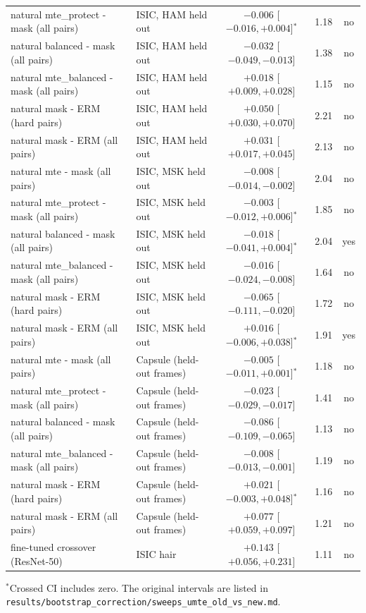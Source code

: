 \begin{center}
{\begin{tabular}{llccc}
natural mte\_protect - mask (all pairs) & ISIC, HAM held out & $-0.006$ [$-0.016, +0.004$]$^*$ & 1.18 & no \\
natural balanced - mask (all pairs) & ISIC, HAM held out & $-0.032$ [$-0.049, -0.013$] & 1.38 & no \\
natural mte\_balanced - mask (all pairs) & ISIC, HAM held out & $+0.018$ [$+0.009, +0.028$] & 1.15 & no \\
natural mask - ERM (hard pairs) & ISIC, HAM held out & $+0.050$ [$+0.030, +0.070$] & 2.21 & no \\
natural mask - ERM (all pairs) & ISIC, HAM held out & $+0.031$ [$+0.017, +0.045$] & 2.13 & no \\
natural mte - mask (all pairs) & ISIC, MSK held out & $-0.008$ [$-0.014, -0.002$] & 2.04 & no \\
natural mte\_protect - mask (all pairs) & ISIC, MSK held out & $-0.003$ [$-0.012, +0.006$]$^*$ & 1.85 & no \\
natural balanced - mask (all pairs) & ISIC, MSK held out & $-0.018$ [$-0.041, +0.004$]$^*$ & 2.04 & yes \\
natural mte\_balanced - mask (all pairs) & ISIC, MSK held out & $-0.016$ [$-0.024, -0.008$] & 1.64 & no \\
natural mask - ERM (hard pairs) & ISIC, MSK held out & $-0.065$ [$-0.111, -0.020$] & 1.72 & no \\
natural mask - ERM (all pairs) & ISIC, MSK held out & $+0.016$ [$-0.006, +0.038$]$^*$ & 1.91 & yes \\
natural mte - mask (all pairs) & Capsule (held-out frames) & $-0.005$ [$-0.011, +0.001$]$^*$ & 1.18 & no \\
natural mte\_protect - mask (all pairs) & Capsule (held-out frames) & $-0.023$ [$-0.029, -0.017$] & 1.41 & no \\
natural balanced - mask (all pairs) & Capsule (held-out frames) & $-0.086$ [$-0.109, -0.065$] & 1.13 & no \\
natural mte\_balanced - mask (all pairs) & Capsule (held-out frames) & $-0.008$ [$-0.013, -0.001$] & 1.19 & no \\
natural mask - ERM (hard pairs) & Capsule (held-out frames) & $+0.021$ [$-0.003, +0.048$]$^*$ & 1.16 & no \\
natural mask - ERM (all pairs) & Capsule (held-out frames) & $+0.077$ [$+0.059, +0.097$] & 1.21 & no \\
fine-tuned crossover (ResNet-50) & ISIC hair & $+0.143$ [$+0.056, +0.231$] & 1.11 & no \\
\bottomrule\end{tabular}}\end{center}
{\footnotesize $^*$Crossed CI includes zero. The original intervals are listed in \texttt{results/bootstrap\_correction/sweeps\_umte\_old\_vs\_new.md}.}
